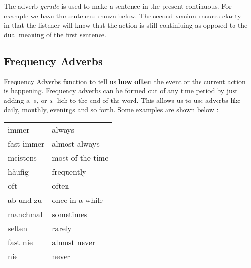 \documentclass[a4paper,twocolumn,10pt]{article}
\newcommand{\subsectionend}
{
\nolinenumbers
\linenumbers
}
\newcommand{\tabularxtable}[3]
{

	\vspace{0.5cm}
	\nolinenumbers

	\begin{tabularx}{#1}{#2}
		#3
	\end{tabularx}

	\linenumbers
	\vspace{0.5cm}
}
\begin{document}

The adverb \textit{gerade} is used to make a sentence in the present continuous.
For example we have the sentences shown below. The second version ensures
clarity in that the listener will know that the action is still continiuing as
opposed to the dual meaning of the first sentence.

\subsectionend

\subsection{Frequency Adverbs}
\label{ssec:frequency_adverbs}


Frequency Adverbs function to tell us \textbf {how often} the event or the
current action is happening. Frequency adverbs can be formed out of any time
period by just adding a -s, or a -lich to the end of the word. This allows us to
use adverbs like daily, monthly, evenings and so forth. Some examples are shown
below :



\tabularxtable
{ 0.95\linewidth  }
{lX}
{
\rowcolor{white}     immer      & always \\
\rowcolor{lightgray} fast immer & almost always \\
\rowcolor{white}     meistens   & most of the time \\
\rowcolor{lightgray} häufig     & frequently \\
\rowcolor{white}     oft        & often \\
\rowcolor{lightgray} ab und zu  & once in a while \\
\rowcolor{white}     manchmal   & sometimes \\
\rowcolor{lightgray} selten     & rarely \\
\rowcolor{white}     fast nie   & almost never \\
\rowcolor{lightgray} nie        & never \\


}


\end{document}
